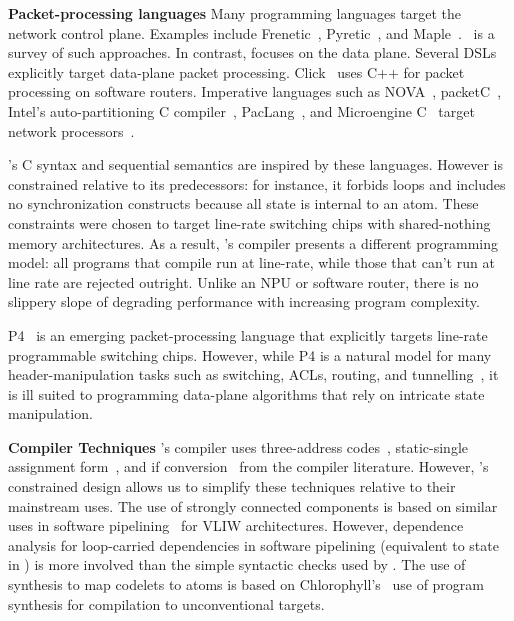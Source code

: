 \textbf{Packet-processing languages}
Many programming languages target the network control plane. Examples include
Frenetic~\cite{frenetic}, Pyretic~\cite{pyretic}, and
Maple~\cite{maple}.~\cite{language_survey} is a survey of such approaches.  In
contrast, \pktlanguage focuses on the data plane. Several DSLs explicitly
target data-plane packet processing. Click~\cite{click} uses C++ for packet
processing on software routers. Imperative languages such as NOVA~\cite{nova},
packetC~\cite{packetc}, Intel's auto-partitioning C
compiler~\cite{intel_uiuc_pldi}, PacLang~\cite{paclang_lang,
paclang_partitioner}, and Microengine C~\cite{microenginec, intel_ixa} target
network processors~\cite{ixp2800, ixp4xx}.

\pktlanguage's C syntax and sequential semantics are inspired by these
languages. However \pktlanguage is constrained relative to its predecessors:
for instance, it forbids loops and includes no synchronization constructs
because all state is internal to an atom. These constraints were chosen to
target line-rate switching chips with shared-nothing memory architectures. As a
result, \pktlanguage's compiler presents a different programming model: all
\pktlanguage programs that compile run at line-rate, while those that can't run
at line rate are rejected outright. Unlike an NPU or software router, there is
no slippery slope of degrading performance with increasing program complexity.

P4~\cite{p4} is an emerging packet-processing language that explicitly targets
line-rate programmable switching chips. However, while P4 is a natural model
for many header-manipulation tasks such as switching, ACLs, routing, and
tunnelling~\cite{dc_p4}, it is ill suited to programming data-plane algorithms that
rely on intricate state manipulation.

\textbf{Compiler Techniques}
\pktlanguage's compiler uses three-address codes~\cite{tac}, static-single
assignment form~\cite{ssa}, and if conversion~\cite{if_conversion} from the
compiler literature. However, \pktlanguage's constrained design allows us to
simplify these techniques relative to their mainstream uses.  The use of
strongly connected components is based on similar uses in software
pipelining~\cite{software_pipelining} for VLIW architectures. However,
dependence analysis for loop-carried dependencies in software pipelining
(equivalent to state in \pktlanguage) is more involved than the simple
syntactic checks used by \pktlanguage. The use of synthesis to map codelets to
atoms is based on Chlorophyll's~\cite{chlorophyll} use of program synthesis for
compilation to unconventional targets.

